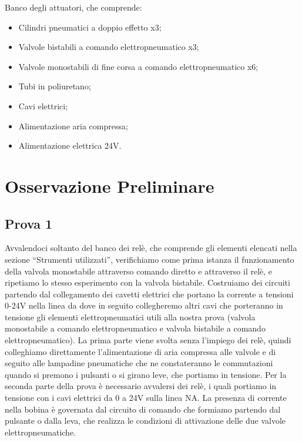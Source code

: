 \documentclass[a4paper]{article}
\begin{document}
Banco degli attuatori, che comprende:
\begin{itemize}
\item Cilindri pneumatici a doppio effetto x3;
\item Valvole bistabili a comando elettropneumatico x3;
\item Valvole monostabili di fine corsa a comando elettropneumatico x6;
\item Tubi in poliuretano;
\item Cavi elettrici;
\item Alimentazione aria compressa;
\item Alimentazione elettrica 24V.
\end{itemize}


\section{Osservazione Preliminare}
\subsection{Prova 1}
Avvalendoci soltanto del banco dei relè, che comprende gli elementi elencati nella sezione “Strumenti utilizzati”, verifichiamo come prima istanza il funzionamento della valvola monostabile attraverso comando diretto e attraverso il relè, e ripetiamo lo stesso esperimento con la valvola bistabile. Costruiamo dei circuiti partendo dal collegamento dei cavetti elettrici che portano la corrente a tensioni 0-24V nella linea da dove in seguito collegheremo altri cavi che porteranno in tensione gli elementi elettropneumatici utili alla nostra prova (valvola monostabile a comando elettropneumatico e valvola bistabile a comando elettropneumatico). La prima parte viene svolta senza l’impiego dei relè, quindi colleghiamo direttamente l’alimentazione di aria compressa alle valvole e di seguito alle lampadine pneumatiche che ne constateranno le commutazioni quando si premono i pulsanti o si girano leve, che portiamo in tensione. Per la seconda parte della prova è necessario avvalersi dei relè, i quali portiamo in tensione con i cavi elettrici da 0 a 24V sulla linea NA. La presenza di corrente nella bobina è governata dal circuito di comando che formiamo partendo dal pulsante o dalla leva, che realizza le condizioni di attivazione delle due valvole elettropneumatiche.
\end{document}
